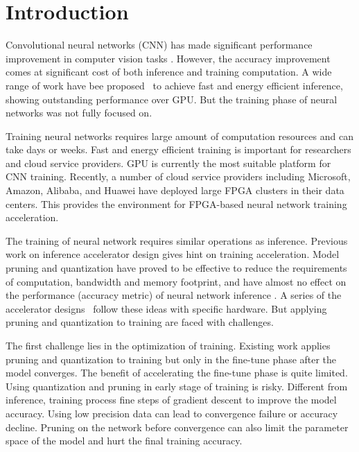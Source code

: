 \section{Introduction}\label{sec:introduction}

Convolutional neural networks (CNN) has made significant performance improvement in computer vision tasks \cite{He2016Deep, Shelhamer2017Fully}. However, the accuracy improvement comes at significant cost of both inference and training computation. A wide range of work have bee proposed~\cite{qiu2016going, han2017ese} to achieve fast and energy efficient inference, showing outstanding performance over GPU. But the training phase of neural networks was not fully focused on. 

Training neural networks requires large amount of computation resources and can take days or weeks. Fast and energy efficient training is important for researchers and cloud service providers. GPU is currently the most suitable platform for CNN training. Recently, a number of cloud service providers including Microsoft, Amazon, Alibaba, and Huawei have deployed large FPGA clusters in their data centers. This provides the environment for FPGA-based neural network training acceleration.

The training of neural network requires similar operations as inference. Previous work on inference accelerator design gives hint on training acceleration. Model pruning and quantization have proved to be effective to reduce the requirements of computation, bandwidth and memory footprint, and have almost no effect on the performance (accuracy metric) of neural network inference \cite{han2015deep}. A series of the accelerator designs~\cite{qiu2016going, han2017ese} follow these ideas with specific hardware. But applying pruning and quantization to training are faced with challenges.

The first challenge lies in the optimization of training. Existing work \cite{han2015deep} applies pruning and quantization to training but only in the fine-tune phase after the model converges. The benefit of accelerating the fine-tune phase is quite limited. Using quantization and pruning in early stage of training is risky. Different from inference, training process fine steps of gradient descent to improve the model accuracy. Using low precision data can lead to convergence failure or accuracy decline. Pruning on the network before convergence can also limit the parameter space of the model and hurt the final training accuracy. 

